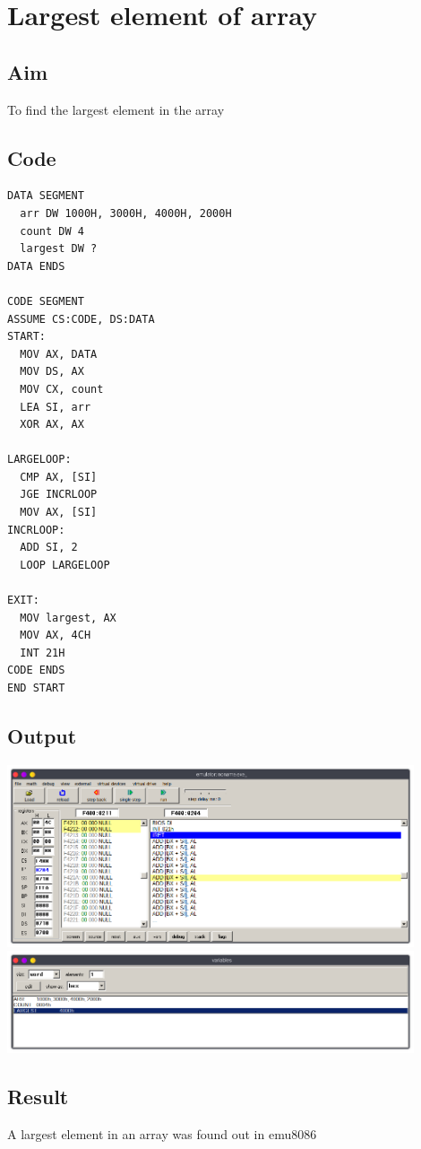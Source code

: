 \section{Largest element of array}
\subsection{Aim}
To find the largest element in the array

\subsection{Code}
\begin{lstlisting}
DATA SEGMENT
  arr DW 1000H, 3000H, 4000H, 2000H
  count DW 4
  largest DW ?
DATA ENDS

CODE SEGMENT
ASSUME CS:CODE, DS:DATA
START:
  MOV AX, DATA
  MOV DS, AX
  MOV CX, count
  LEA SI, arr
  XOR AX, AX

LARGELOOP:
  CMP AX, [SI]
  JGE INCRLOOP
  MOV AX, [SI]
INCRLOOP:
  ADD SI, 2
  LOOP LARGELOOP

EXIT:
  MOV largest, AX
  MOV AX, 4CH
  INT 21H
CODE ENDS
END START
\end{lstlisting}

\subsection{Output}
\begin{center}
	\includegraphics[width=0.90\textwidth]{img/p10/ss1.png}
	\includegraphics[width=0.90\textwidth]{img/p10/ss2.png}
\end{center}

\subsection{Result}
A largest element in an array was found out in emu8086